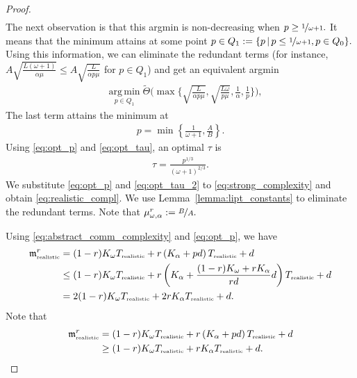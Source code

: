 \documentclass{article} %
\theoremstyle{plain}
\theoremstyle{definition}
\theoremstyle{remark}
\newcommand{\eqdef}{:=}
\DeclareMathOperator*{\argmin}{arg\,min}%
\begin{document}
\begin{proof}
\begin{align*}
    \end{align*}
    The next observation is that this argmin is non-decreasing when $p \geq \nicefrac{1}{\omega + 1}.$ It means that the minimum attains at some point $p \in Q_1 \eqdef \{p\,|\, p \leq \nicefrac{1}{\omega + 1}, p \in Q_0\}.$ Using this information, we can eliminate the redundant terms (for instance, $A\sqrt{\frac{L (\omega + 1)}{\alpha \mu}} \leq A\sqrt{\frac{L}{\alpha p \mu}}$ for $p \in Q_1$) and get an equivalent argmin
    \begin{align*}
      &\argmin\limits_{p \in Q_1}\widetilde{\Theta}\Bigg(\max\Bigg\{\sqrt{\frac{L}{\alpha p \mu}}, \sqrt{\frac{L \omega}{p \mu}}, \frac{1}{\alpha},  \frac{1}{p}\Bigg\}\Bigg),
    \end{align*}
    The last term attains the minimum at 
    \begin{align}
      \label{eq:opt_p}
      p = \min\left\{\frac{1}{\omega + 1}, \frac{A}{B}\right\}.
    \end{align}
    Using \eqref{eq:opt_p} and \eqref{eq:opt_tau}, an optimal $\tau$ is
    \begin{align}
      \label{eq:opt_tau_2}
      \tau = \frac{p^{1/3}}{(\omega + 1)^{2/3}}.
    \end{align}
    We substitute \eqref{eq:opt_p} and \eqref{eq:opt_tau_2} to \eqref{eq:strong_complexity} and obtain \eqref{eq:realistic_compl}. We use Lemma~\ref{lemma:lipt_constants} to eliminate the redundant terms. Note that $\mu^r_{\omega, \alpha} \eqdef \nicefrac{B}{A}.$
    
Using \eqref{eq:abstract_comm_complexity} and \eqref{eq:opt_p}, we have
    \begin{align*}
      \mathfrak{m}^{r}_{{\scriptscriptstyle \textnormal{realistic}}} &= (1 - r)K_{\omega} T_{{\scriptscriptstyle \textnormal{realistic}}} + r \left(K_{\alpha} + p d\right) T_{{\scriptscriptstyle \textnormal{realistic}}} + d\\
     &\leq (1 - r)K_{\omega} T_{{\scriptscriptstyle \textnormal{realistic}}} + r \left(K_{\alpha} + \frac{(1 - r)K_{\omega} + r K_{\alpha}}{r d} d\right) T_{{\scriptscriptstyle \textnormal{realistic}}} + d \\
     &= 2 (1 - r)K_{\omega} T_{{\scriptscriptstyle \textnormal{realistic}}} + 2 r K_{\alpha} T_{{\scriptscriptstyle \textnormal{realistic}}} + d.
    \end{align*}
    Note that
    \begin{align*}
      \mathfrak{m}^{r}_{{\scriptscriptstyle \textnormal{realistic}}} &= (1 - r)K_{\omega} T_{{\scriptscriptstyle \textnormal{realistic}}} + r \left(K_{\alpha} + p d\right) T_{{\scriptscriptstyle \textnormal{realistic}}} + d\\
     &\geq (1 - r)K_{\omega} T_{{\scriptscriptstyle \textnormal{realistic}}} + r K_{\alpha} T_{{\scriptscriptstyle \textnormal{realistic}}} + d.
    \end{align*}
    



\end{proof}
\end{document}

